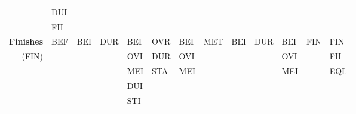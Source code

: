 \documentclass[11pt]{report}
\newenvironment{vvarmargin}[2]
{
  \begin{list}{}
  {
    \setlength{\topsep}{0pt}
    \setlength{\leftmargin}{0pt}
    \setlength{\rightmargin}{0pt}
    \setlength{\listparindent}{\parindent}
    \setlength{\itemindent}{\parindent}
    \setlength{\parsep}{0pt plus 1pt}
    \addtolength{\leftmargin}{#1}\addtolength{\rightmargin}{#2}
  }
  \item
}
{
  \end{list}
}
\begin{document}
\begin{table}[p]
\begin{vvarmargin}{-4cm}{-4cm}
\begin{center}
\begin{tabular}[t]{|r|l|l|l|l|l|l|l|l|l|l|l|l|}
                                          & DUI                     &                         &                         &                         &                         &                         &                         &                         &                         &                         &                         &                         \\
                                          & FII                     &                         &                         &                         &                         &                         &                         &                         &                         &                         &                         &                         \\
                  \hline
                  \textbf{Finishes}       & BEF                     & BEI                     & DUR                     & BEI                     & OVR                     & BEI                     & MET                     & BEI                     & DUR                     & BEI                     & FIN                     & FIN                     \\
                  (FIN)                   &                         &                         &                         & OVI                     & DUR                     & OVI                     &                         &                         &                         & OVI                     &                         & FII                     \\
                                          &                         &                         &                         & MEI                     & STA                     & MEI                     &                         &                         &                         & MEI                     &                         & EQL                     \\
                                          &                         &                         &                         & DUI                     &                         &                         &                         &                         &                         &                         &                         &                         \\
                                          &                         &                         &                         & STI                     &                         &                         &                         &                         &                         &                         &                         &                         \\

\end{tabular}
\end{center}
\end{vvarmargin}
\end{table}
\end{document}
